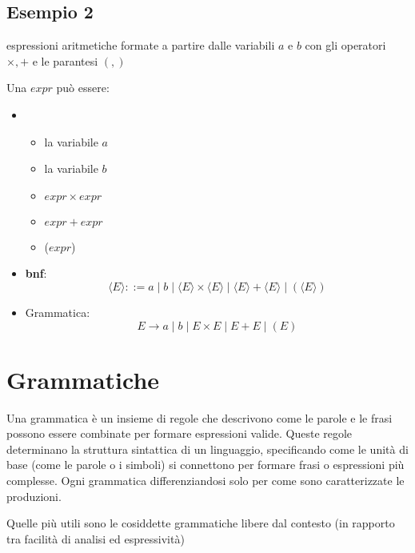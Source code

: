 \subsection{Esempio 2}
espressioni aritmetiche formate a partire dalle variabili $a$ e $b$ con gli operatori $\times, +$ e le parantesi $(,)$

Una $expr$ può essere:
\begin{itemize}
    \item \begin{itemize}
        \item la variabile $a$
        \item la variabile $b$
        \item $expr\times expr$
        \item $expr + expr$
        \item ($expr$)
    \end{itemize}
    \item \textbf{bnf}:
      \[
        \langle E \rangle ::= a\mid b\mid \langle E \rangle\times \langle E \rangle \mid \langle E \rangle + \langle E \rangle\mid (\langle E \rangle)
      \]
    \item Grammatica:
    \[
        E\to a\mid b\mid E\times E\mid E+E\mid (E)    
    \]
\end{itemize}

\section{Grammatiche} 
Una grammatica è un insieme di regole che descrivono come le parole e le frasi possono essere combinate per formare espressioni valide. Queste regole determinano la struttura sintattica di un linguaggio, specificando come le unità di base (come le parole o i simboli) si connettono per formare frasi o espressioni più complesse. Ogni grammatica  differenziandosi solo per come sono caratterizzate le produzioni.

Quelle più utili sono le cosiddette grammatiche libere dal contesto (in rapporto tra facilità di analisi ed espressività) 


